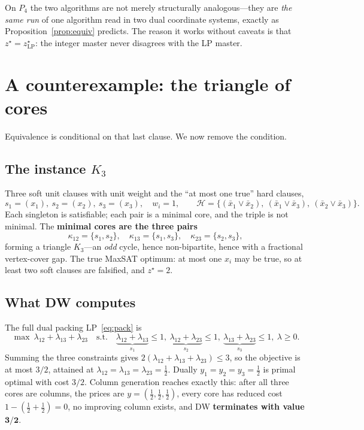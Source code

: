 \documentclass[11pt,a4paper]{article}
\begin{document}
On $P_4$ the two algorithms are not merely structurally analogous---they are
\emph{the same run} of one algorithm read in two dual coordinate systems,
exactly as Proposition~\ref{prop:equiv} predicts. The reason it works without
caveats is that $z^\star = z^\star_{\mathrm{LP}}$: the integer master never
disagrees with the LP master.

\section{A counterexample: the triangle of cores}
\label{sec:counter}

Equivalence is conditional on that last clause. We now remove the condition.

\subsection{The instance \texorpdfstring{$K_3$}{K3}}

Three soft unit clauses with unit weight and the ``at most one true'' hard
clauses,
\[
s_1=(x_1),\ s_2=(x_2),\ s_3=(x_3),\quad w_i=1,\qquad
\mathcal{H} = \{(\bar x_1\vee\bar x_2),\ (\bar x_1\vee\bar x_3),\ (\bar x_2\vee\bar x_3)\}.
\]
Each singleton is satisfiable; each pair is a minimal core, and the triple is
not minimal. The \textbf{minimal cores are the three pairs}
\[
\kappa_{12}=\{s_1,s_2\},\quad \kappa_{13}=\{s_1,s_3\},\quad \kappa_{23}=\{s_2,s_3\},
\]
forming a triangle $K_3$---an \emph{odd} cycle, hence non-bipartite, hence with
a fractional vertex-cover gap. The true MaxSAT optimum: at most one $x_i$ may be
true, so at least two soft clauses are falsified, and $z^\star = 2$.

\subsection{What DW computes}

The full dual packing LP~\eqref{eq:pack} is
\[
\max\ \lambda_{12}+\lambda_{13}+\lambda_{23}
\quad\text{s.t.}\quad
\underbrace{\lambda_{12}+\lambda_{13}}_{s_1}\le1,\
\underbrace{\lambda_{12}+\lambda_{23}}_{s_2}\le1,\
\underbrace{\lambda_{13}+\lambda_{23}}_{s_3}\le1,\
\lambda\ge0.
\]
Summing the three constraints gives $2(\lambda_{12}+\lambda_{13}+\lambda_{23})
\le 3$, so the objective is at most $3/2$, attained at $\lambda_{12} =
\lambda_{13} = \lambda_{23} = \tfrac12$. Dually $y_1=y_2=y_3=\tfrac12$ is primal
optimal with cost $3/2$. Column generation reaches exactly this: after all three
cores are columns, the prices are $y=(\tfrac12,\tfrac12,\tfrac12)$, every core
has reduced cost $1 - (\tfrac12+\tfrac12) = 0$, no improving column exists, and
DW \textbf{terminates with value $\boldsymbol{3/2}$}.
\end{document}
